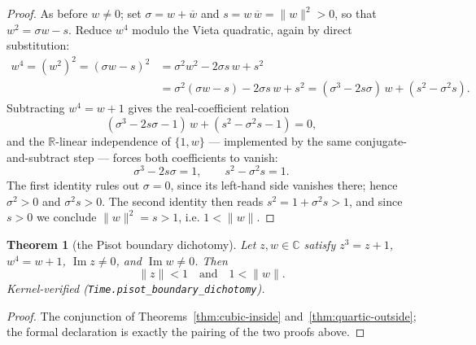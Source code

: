 \documentclass[11pt]{amsart}
\theoremstyle{plain}
\newtheorem{theorem}{Theorem}[section]
\theoremstyle{definition}
\theoremstyle{remark}
\begin{document}
\begin{proof}
As before $w \neq 0$; set $\sigma = w + \overline{w}$ and $s = w\,\overline{w} = \lVert w \rVert^2 > 0$, so that $w^2 = \sigma w - s$. Reduce $w^4$ modulo the Vieta quadratic, again by direct substitution:
\begin{align*}
w^4 = (w^2)^2 = (\sigma w - s)^2
&= \sigma^2 w^2 - 2 \sigma s\, w + s^2 \\
&= \sigma^2 (\sigma w - s) - 2 \sigma s\, w + s^2
= (\sigma^3 - 2 s \sigma)\, w + (s^2 - \sigma^2 s) .
\end{align*}
Subtracting $w^4 = w + 1$ gives the real-coefficient relation
\[
(\sigma^3 - 2 s \sigma - 1)\, w + (s^2 - \sigma^2 s - 1) = 0 ,
\]
and the $\mathbb{R}$-linear independence of $\{1, w\}$ --- implemented by the same conjugate-and-subtract step --- forces both coefficients to vanish:
\begin{equation}\label{eq:quartic-system}
\sigma^3 - 2 s \sigma = 1, \qquad s^2 - \sigma^2 s = 1 .
\end{equation}
The first identity rules out $\sigma = 0$, since its left-hand side vanishes there; hence $\sigma^2 > 0$ and $\sigma^2 s > 0$. The second identity then reads $s^2 = 1 + \sigma^2 s > 1$, and since $s > 0$ we conclude $\lVert w \rVert^2 = s > 1$, i.e. $1 < \lVert w \rVert$.
\end{proof}

\begin{theorem}[the Pisot boundary dichotomy]\label{thm:dichotomy}
Let $z, w \in \mathbb{C}$ satisfy $z^3 = z + 1$, $w^4 = w + 1$, $\operatorname{Im} z \neq 0$, and $\operatorname{Im} w \neq 0$. Then
\[
\lVert z \rVert < 1 \quad \text{and} \quad 1 < \lVert w \rVert .
\]
Kernel-verified (\texttt{Time.pisot\_boundary\_dichotomy}).
\end{theorem}

\begin{proof}
The conjunction of Theorems~\ref{thm:cubic-inside} and~\ref{thm:quartic-outside}; the formal declaration is exactly the pairing of the two proofs above.
\end{proof}
\end{document}
